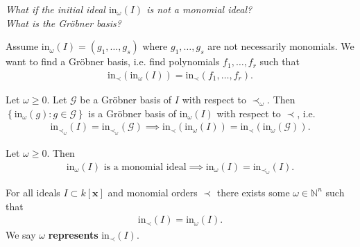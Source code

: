 \documentclass[a4paper, 11pt]{article}
\begin{document}
\begin{center}
  \emph{What if the initial ideal \( \mathrm{in}_\omega(I) \) is not a monomial ideal?\\What is the Gröbner basis?}
\end{center}

 Assume \( \mathrm{in}_\omega(I) = (g_1,\dots,g_s) \) where \( g_1,\dots,g_s \) are not necessarily monomials. We want to find a Gröbner basis, i.e. find polynomials \( f_1,\dots,f_r \) such that 
\begin{align*}
  \mathrm{in}_\prec(\mathrm{in}_\omega(I)) = \mathrm{in}_\prec(f_1,\dots,f_r).
\end{align*}

\begin{cor}\label{groebner-of-inw}
  Let \( \omega \geq 0 \).
  Let \( \mathcal{G} \) be a Gröbner basis of \( I \) with respect to \( \prec_\omega \). Then \( \left\{ \mathrm{in}_\omega(g) : g \in \mathcal{G} \right\} \) is a Gröbner basis of \( \mathrm{in}_\omega(I) \) with respect to \( \prec \), i.e. 
  \begin{align*}
    \mathrm{in}_{\prec_\omega} (I) = \mathrm{in}_{\prec_\omega}(\mathcal{G}) \implies
    \mathrm{in}_\prec(\mathrm{in}_\omega (I)) = \mathrm{in}_\prec({\mathrm{in}_\omega(\mathcal{G})}).
  \end{align*}
\end{cor}

\begin{cor}[Initial ideal: weight = monomial order]
  Let \( \omega \geq 0 \). Then 
  \begin{align*}
    \mathrm{in}_{\omega}(I) \text{ is a monomial ideal} \implies \mathrm{in}_\omega(I) = \mathrm{in}_{\prec_\omega}(I).
  \end{align*}
\end{cor}




\begin{mdframed}
 \begin{thm}
  For all ideals \( I \subset k[\mathbf x] \)  and monomial orders \( \prec \) there exists some \( \omega \in \mathbb N^n \) such that
  \begin{align*}
    \mathrm{in}_\prec(I) = \mathrm{in}_\omega(I).
  \end{align*}
  We say \( \omega \) \textbf{represents} \( \mathrm{in}_\prec(I) \).
\end{thm}
\end{mdframed}
\end{document}
